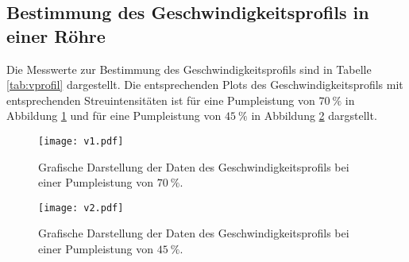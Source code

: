 \FloatBarrier
\subsection{Bestimmung des Geschwindigkeitsprofils in einer Röhre}

Die Messwerte zur Bestimmung des Geschwindigkeitsprofils sind in Tabelle \ref{tab:vprofil} dargestellt.
Die entsprechenden Plots des Geschwindigkeitsprofils mit entsprechenden Streuintensitäten ist für eine Pumpleistung von $\SI{70}{\percent}$ in Abbildung \ref{fig:v1} und für eine Pumpleistung von $\SI{45}{\percent}$ in Abbildung \ref{fig:v2} dargstellt.

\begin{table}
  \centering
  \caption{Messdaten und -ergebnisse für das Geschwindigkeitsprofil des $\SI{10}{\milli\metre}$-Rohr.}
  \label{tab:vprofil}
  \noindent{}
 \end{table}

 \begin{figure}
   \centering
   \texttt{[image: v1.pdf]}
   \caption{Grafische Darstellung der Daten des Geschwindigkeitsprofils bei einer Pumpleistung von $\SI{70}{\percent}$.}
   \label{fig:v1}
 \end{figure}

 \begin{figure}
   \centering
   \texttt{[image: v2.pdf]}
   \caption{Grafische Darstellung der Daten des Geschwindigkeitsprofils bei einer Pumpleistung von $\SI{45}{\percent}$.}
   \label{fig:v2}
 \end{figure}
